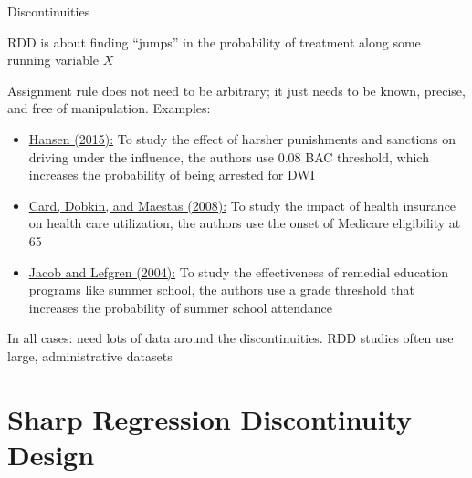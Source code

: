 \documentclass[compress, 8pt]{beamer}
\begin{document}
\begin{frame}{Discontinuities}

RDD is about finding ``jumps'' in the probability of treatment along some running variable $X$

\vspace{3ex}
Assignment rule does not need to be arbitrary; it just needs to be known, precise, and free of manipulation. Examples:
\begin{itemize}
    \item \href{https://doi.org/10.1257/aer.20130189}{Hansen (2015):} To study the effect of harsher punishments and sanctions on driving under the influence, the authors use 0.08 BAC threshold, which increases the probability of being arrested for DWI
    \item \href{https://doi.org/10.1257/aer.98.5.2242}{Card, Dobkin, and Maestas (2008):} To study the impact of health insurance on health care utilization, the authors use the onset of Medicare eligibility at 65
    \item \href{https://doi.org/10.1162/003465304323023778}{Jacob and Lefgren (2004):} To study the effectiveness of remedial education programs like summer school, the authors use a grade threshold that increases the probability of summer school attendance 
\end{itemize}

\vspace{3ex}
In all cases: need lots of data around the discontinuities. RDD studies often use large, administrative datasets
\end{frame}

\section[Sharp RDD]{Sharp Regression Discontinuity Design}
\miniframesoff
\begin{frame}
    \tableofcontents[currentsection]
\end{frame}
\miniframeson
\end{document}
